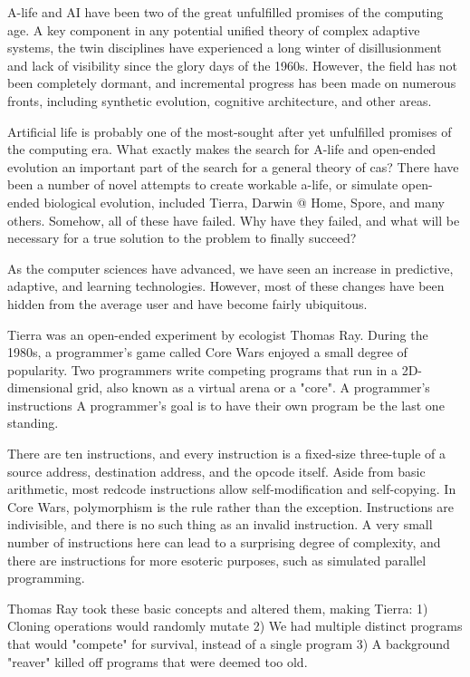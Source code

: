 A-life and AI have been two of the great unfulfilled promises of the computing age. A key component in any potential unified theory of complex adaptive systems, the twin disciplines have experienced a long winter of disillusionment and lack of visibility since the glory days of the 1960s. However, the field has not been completely dormant, and incremental progress has been made on numerous fronts, including synthetic evolution, cognitive architecture, and other areas.

Artificial life is probably one of the most-sought after yet unfulfilled
promises of the computing era. What exactly makes the search for A-life and
open-ended evolution an important part of the search for a general theory
of cas? There have been a number of novel attempts to create  workable
a-life, or simulate open-ended biological evolution, included Tierra,
Darwin @ Home, Spore, and many others. Somehow, all of these have failed.
Why have they failed, and what will be necessary for a true solution to the
problem to finally succeed?


As the computer sciences have advanced, we have seen an increase in predictive, adaptive, and learning technologies. However, most of these changes have been hidden from the average user and have become fairly ubiquitous.

Tierra was an open-ended experiment by ecologist Thomas Ray. During the 1980s, a programmer's game called Core Wars enjoyed a small degree of popularity. Two programmers write competing programs that run in a 2D-dimensional grid, also known as a virtual arena or a "core". A programmer's instructions A programmer's goal is to have their own program be the last one standing.

There are ten instructions, and every instruction is a fixed-size three-tuple of a source address, destination address, and the opcode itself. Aside from basic arithmetic, most redcode instructions allow self-modification and self-copying. In Core Wars, polymorphism is the rule rather than the exception. Instructions are indivisible, and there is no such thing as an invalid instruction. A very small number of instructions here can lead to a surprising degree of complexity, and there are instructions for more esoteric purposes, such as simulated parallel programming.

Thomas Ray took these basic concepts and altered them, making Tierra:
	1) Cloning operations would randomly mutate
	2) We had multiple distinct programs that would "compete" for survival, instead of a single program
	3) A background "reaver" killed off programs that were deemed too old.
	
